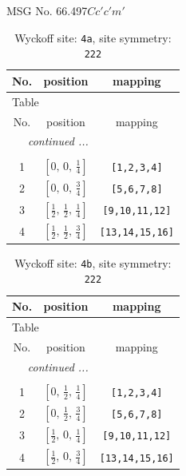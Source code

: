 \documentclass[fleqn,8pt]{jsarticle}
\begin{document}
\setcounter{MaxMatrixCols}{32}

\renewcommand{\tablename}{Table~}
\renewcommand{\figurename}{Figure~}
\begin{center}
\LARGE
MSG No. 66.497\quad$Cc'c'm'$
\end{center}
\renewcommand{\arraystretch}{1.2}
\begin{longtable}{ccc}
\caption{Wyckoff site: {\tt 4a}, site symmetry: {\tt 222}}
 \\
 \hline \hline
No. & position & mapping \\ \hline \endfirsthead

\multicolumn{2}{l}{\tablename\ \thetable{}} \\
 \hline \hline
No. & position & mapping \\ \hline \endhead

 \hline \hline
\multicolumn{2}{r}{\footnotesize\it continued ...} \\ \endfoot

 \hline \hline
\multicolumn{2}{r}{} \\ \endlastfoot

1 & $\left[ 0,\, 0,\, \frac{1}{4} \right]$ & {\tt [1,2,3,4]} \\ \hline
2 & $\left[ 0,\, 0,\, \frac{3}{4} \right]$ & {\tt [5,6,7,8]} \\ \hline
3 & $\left[ \frac{1}{2},\, \frac{1}{2},\, \frac{1}{4} \right]$ & {\tt [9,10,11,12]} \\ \hline
4 & $\left[ \frac{1}{2},\, \frac{1}{2},\, \frac{3}{4} \right]$ & {\tt [13,14,15,16]} \\
\end{longtable}
\renewcommand{\arraystretch}{1.2}
\begin{longtable}{ccc}
\caption{Wyckoff site: {\tt 4b}, site symmetry: {\tt 222}}
 \\
 \hline \hline
No. & position & mapping \\ \hline \endfirsthead

\multicolumn{2}{l}{\tablename\ \thetable{}} \\
 \hline \hline
No. & position & mapping \\ \hline \endhead

 \hline \hline
\multicolumn{2}{r}{\footnotesize\it continued ...} \\ \endfoot

 \hline \hline
\multicolumn{2}{r}{} \\ \endlastfoot

1 & $\left[ 0,\, \frac{1}{2},\, \frac{1}{4} \right]$ & {\tt [1,2,3,4]} \\ \hline
2 & $\left[ 0,\, \frac{1}{2},\, \frac{3}{4} \right]$ & {\tt [5,6,7,8]} \\ \hline
3 & $\left[ \frac{1}{2},\, 0,\, \frac{1}{4} \right]$ & {\tt [9,10,11,12]} \\ \hline
4 & $\left[ \frac{1}{2},\, 0,\, \frac{3}{4} \right]$ & {\tt [13,14,15,16]} \\
\end{longtable}
\end{document}
